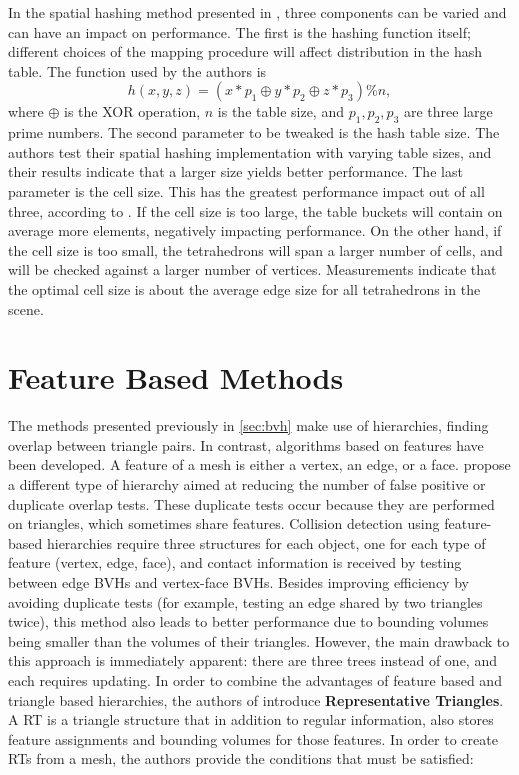 
In the spatial hashing method presented in \citep{thm03}, three components can be varied and can have an impact on performance. The first is the hashing function itself; different choices of the mapping procedure will affect distribution in the hash table. The function used by the authors is \[h(x, y, z) = (x * p_{1} \oplus y * p_{2} \oplus  z * p_{3}) \% n,\] where $\oplus$ is the XOR operation, $n$ is the table size, and $p_{1}, p_{2}, p_{3}$ are three large prime numbers. The second parameter to be tweaked is the hash table size. The authors test their spatial hashing implementation with varying table sizes, and their results indicate that a larger size yields better performance. The last parameter is the cell size. This has the greatest performance impact out of all three, according to \citep{thm03}. If the cell size is too large, the table buckets will contain on average more elements, negatively impacting performance. On the other hand, if the cell size is too small, the tetrahedrons will span a larger number of cells, and will be checked against a larger number of vertices. Measurements indicate that the optimal cell size is about the average edge size for all tetrahedrons in the scene.


\FloatBarrier
\section{Feature Based Methods}
\label{sec:feature}

The methods presented previously in \autoref{sec:bvh} make use of hierarchies, finding overlap between triangle pairs. In contrast, algorithms based on features have been developed. A feature of a mesh is either a vertex, an edge, or a face. \citep{curtis2008} propose a different type of hierarchy aimed at reducing the number of false positive or duplicate overlap tests. These duplicate tests occur because they are performed on triangles, which sometimes share features. Collision detection using feature-based hierarchies require three structures for each object, one for each type of feature (vertex, edge, face), and contact information is received by testing between edge BVHs and vertex-face BVHs. Besides improving efficiency by avoiding duplicate tests (for example, testing an edge shared by two triangles twice), this method also leads to better performance due to bounding volumes being smaller than the volumes of their triangles. However, the main drawback to this approach is immediately apparent: there are three trees instead of one, and each requires updating. In order to combine the advantages of feature based and triangle based hierarchies, the authors of \citep{curtis2008} introduce \textbf{Representative Triangles}. A RT is a triangle structure that in addition to regular information, also stores feature assignments and bounding volumes for those features. In order to create RTs from a mesh, the authors provide the conditions that must be satisfied:

